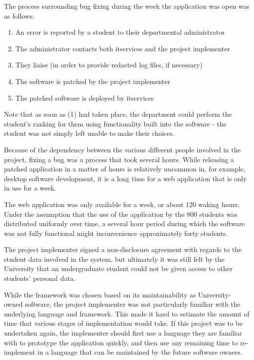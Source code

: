\documentclass[draft]{scrartcl}
\begin{document}
The process surrounding bug fixing during the week the application was open
was as follows:

\begin{enumerate}
  \item An error is reported by a student to their departmental administrator
  \item The administrator contacts both \gls{itservices} and the project implementer
  \item They liaise (in order to provide redacted log files, if necessary)
  \item The software is patched by the project implementer
  \item The patched software is deployed by \gls{itservices}
\end{enumerate}

Note that as soon as (1) had taken place, the department could perform the
student's ranking for them using functionality built into the software - the
student was not simply left unable to make their choices.

Because of the dependency between the various different people involved in the
project, fixing a bug was a process that took several hours. While releasing a
patched application in a matter of hours is relatively uncommon in, for
example, desktop software development, it is a long time for a web application
that is only in use for a week.

The web application was only available for a week, or about 120 waking hours.
Under the assumption that the use of the application by the 800 students was
distributed uniformly over time, a several hour period during which the
software was not fully functional might inconvenience approximately forty
students.

The project implementer signed a non-disclosure agreement with regards to the
student data involved in the system, but ultimately it was still felt by the
University that an undergraduate student could not be given access to other
students' personal data.


While the framework was chosen based on its maintainability as
University-owned software, the project implementer was not particularly
familiar with the underlying language and framework. This made it hard to
estimate the amount of time that various stages of implementation would take.
If this project was to be undertaken again, the implementer should first use a
language they are familiar with to prototype the application quickly, and then
use any remaining time to re-implement in a language that can be maintained by
the future software owners.
\end{document}
